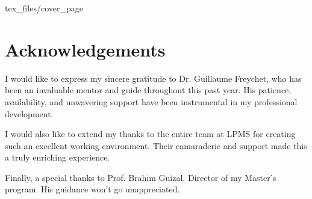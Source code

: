 \documentclass[12pt]{article}
\begin{document}
 {tex_files/cover_page}

\newpage
\section*{Acknowledgements}

I would like to express my sincere gratitude to Dr. Guillaume Freychet, who has been an invaluable mentor and guide throughout this past year. His patience, availability, and unwavering support have been instrumental in my professional development.

I would also like to extend my thanks to the entire team at LPMS for creating such an excellent working environment. Their camaraderie and support made this a truly enriching experience.

Finally, a special thanks to Prof. Brahim Guizal, Director of my Master's program. His guidance won't go unappreciated.

\medskip


\newpage

\tableofcontents





\newpage



\newpage



\newpage



\newpage



\newpage

\printbibliography
\end{document}
